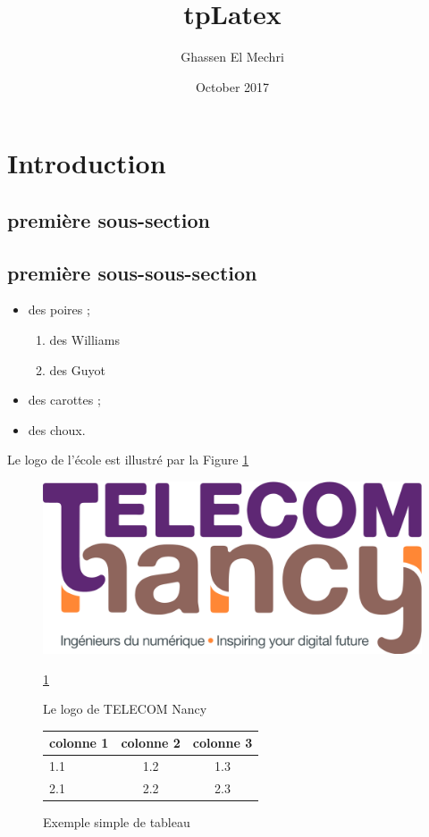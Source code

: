 \documentclass{article}
\title{tpLatex}
\author{Ghassen El Mechri}
\date{October 2017}
\begin{document}
\maketitle

\section{Introduction}
\subsection{première sous-section}
\subsection{première sous-sous-section }
\begin{itemize}
\item des poires ;
    \begin{enumerate}
        \item des Williams
        \item des Guyot
    \end{enumerate}
\item des carottes ;
\item des choux.
\end{itemize}

 Le logo de l'école est illustré par la Figure \ref{fig:logo_tncy}


\begin{figure}
    \centering
    \includegraphics[scale=0.1]{logo_TNCY.png}
    \caption{Le logo de TELECOM Nancy}
    \label{fig:logo_tncy}
    \ref{fig:logo_tncy}
\end{figure}

\begin{figure}
   \begin{center}
   \begin{tabular}{|l|c|c|}
   \hline
    colonne 1 & colonne 2 & colonne 3 \\
   \hline
    1.1 & 1.2 & 1.3 \\
    \hline
    2.1 & 2.2 & 2.3 \\
   \hline
   \end{tabular}
  \end{center}
  \caption{Exemple simple de tableau}
  \label{tab:exemple}
 \end{figure}   
\end{document}
